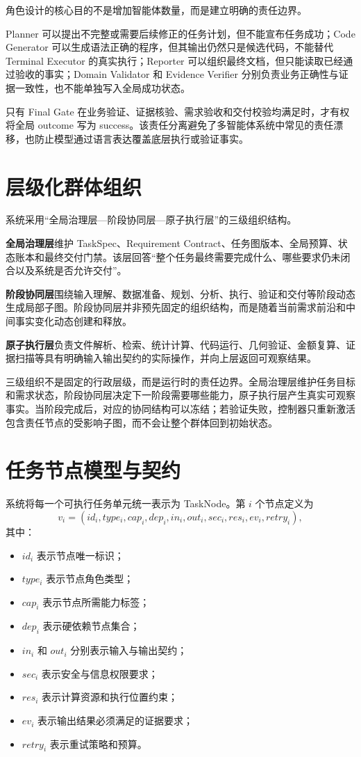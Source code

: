 \documentclass[UTF8,a4paper,12pt,oneside]{ctexbook}
\begin{document}
角色设计的核心目的不是增加智能体数量，而是建立明确的责任边界。

Planner 可以提出不完整或需要后续修正的任务计划，但不能宣布任务成功；Code Generator 可以生成语法正确的程序，但其输出仍然只是候选代码，不能替代 Terminal Executor 的真实执行；Reporter 可以组织最终文档，但只能读取已经通过验收的事实；Domain Validator 和 Evidence Verifier 分别负责业务正确性与证据一致性，也不能单独写入全局成功状态。

只有 Final Gate 在业务验证、证据核验、需求验收和交付校验均满足时，才有权将全局 outcome 写为 success。该责任分离避免了多智能体系统中常见的责任漂移，也防止模型通过语言表达覆盖底层执行或验证事实。


\section{层级化群体组织}

系统采用“全局治理层—阶段协同层—原子执行层”的三级组织结构。

\textbf{全局治理层}维护 TaskSpec、Requirement Contract、任务图版本、全局预算、状态账本和最终交付门禁。该层回答“整个任务最终需要完成什么、哪些要求仍未闭合以及系统是否允许交付”。

\textbf{阶段协同层}围绕输入理解、数据准备、规划、分析、执行、验证和交付等阶段动态生成局部子图。阶段协同层并非预先固定的组织结构，而是随着当前需求前沿和中间事实变化动态创建和释放。

\textbf{原子执行层}负责文件解析、检索、统计计算、代码运行、几何验证、金额复算、证据扫描等具有明确输入输出契约的实际操作，并向上层返回可观察结果。

三级组织不是固定的行政层级，而是运行时的责任边界。全局治理层维护任务目标和需求状态，阶段协同层决定下一阶段需要哪些能力，原子执行层产生真实可观察事实。当阶段完成后，对应的协同结构可以冻结；若验证失败，控制器只重新激活包含责任节点的受影响子图，而不会让整个群体回到初始状态。


\section{任务节点模型与契约}

系统将每一个可执行任务单元统一表示为 TaskNode。第 $i$ 个节点定义为
\[
v_i=
(id_i,type_i,cap_i,dep_i,in_i,out_i,sec_i,res_i,ev_i,retry_i),
\]
其中：

\begin{itemize}
    \item $id_i$ 表示节点唯一标识；
    \item $type_i$ 表示节点角色类型；
    \item $cap_i$ 表示节点所需能力标签；
    \item $dep_i$ 表示硬依赖节点集合；
    \item $in_i$ 和 $out_i$ 分别表示输入与输出契约；
    \item $sec_i$ 表示安全与信息权限要求；
    \item $res_i$ 表示计算资源和执行位置约束；
    \item $ev_i$ 表示输出结果必须满足的证据要求；
    \item $retry_i$ 表示重试策略和预算。
\end{itemize}
\end{document}
